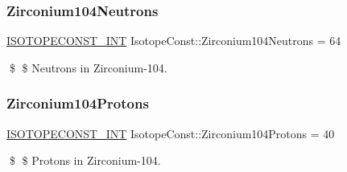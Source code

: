 \subsubsection{\texorpdfstring{Zirconium104\+Neutrons}{Zirconium104Neutrons}}
{\footnotesize\ttfamily \mbox{\hyperlink{group___isotope_const-_macros_ga5f18360b3e99483a35c32d789e62621c}{I\+S\+O\+T\+O\+P\+E\+C\+O\+N\+S\+T\+\_\+\+I\+NT}} Isotope\+Const\+::\+Zirconium104\+Neutrons = 64}

\$ \$ Neutrons in Zirconium-\/104. \mbox{\label{group___isotope_const-_zirconium-_zr104_ga01e8c6eef3b780da9f6edc38a7ef1736}} 
\subsubsection{\texorpdfstring{Zirconium104\+Protons}{Zirconium104Protons}}
{\footnotesize\ttfamily \mbox{\hyperlink{group___isotope_const-_macros_ga5f18360b3e99483a35c32d789e62621c}{I\+S\+O\+T\+O\+P\+E\+C\+O\+N\+S\+T\+\_\+\+I\+NT}} Isotope\+Const\+::\+Zirconium104\+Protons = 40}

\$ \$ Protons in Zirconium-\/104. 